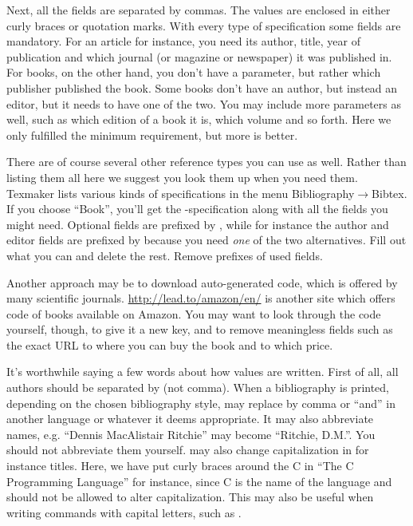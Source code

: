 {Next, all the fields are separated by commas. The values are enclosed in either curly braces or quotation marks. With every type of specification some fields are mandatory. For an article for instance, you need its author, title, year of publication and which journal (or magazine or newspaper) it was published in. For books, on the other hand, you don't have a  parameter, but rather which publisher published the book. Some books don't have an author, but instead an editor, but it needs to have one of the two. You may include more parameters as well, such as which edition of a book it is, which volume and so forth. Here we only fulfilled the minimum requirement, but more is better.

There are of course several other reference types you can use as well. Rather than listing them all here we suggest you look them up when you need them. Texmaker lists various kinds of specifications in the menu Bibliography$\rightarrow$Bibtex. If you choose ``Book'', you'll get the -specification along with all the fields you might need. Optional fields are prefixed by , while for instance the author and editor fields are prefixed by  because you need \emph{one} of the two alternatives. Fill out what you can and delete the rest. Remove prefixes of used fields.

Another approach may be to download auto-generated \bibtex{} code, which is offered by many scientific journals. \url{http://lead.to/amazon/en/} is another site which offers \bibtex{} code of books available on Amazon. You may want to look through the code yourself, though, to give it a new key, and to remove meaningless fields such as the exact URL to where you can buy the book and to which price.

It's worthwhile saying a few words about how values are written. First of all, all authors should be separated by  (not comma). When a bibliography is printed, depending on the chosen bibliography style, \bibtex{} may replace  by comma or ``and'' in another language or whatever it deems appropriate. It may also abbreviate names, e.g. ``Dennis MacAlistair Ritchie'' may become ``Ritchie, D.M.''. You should not abbreviate them yourself. \bibtex{} may also change capitalization in for instance titles. Here, we have put curly braces around the C in ``The C Programming Language'' for instance, since C is the name of the language and \bibtex{} should not be allowed to alter capitalization. This may also be useful when writing commands with capital letters, such as \latexin{\LaTeX}.

}
